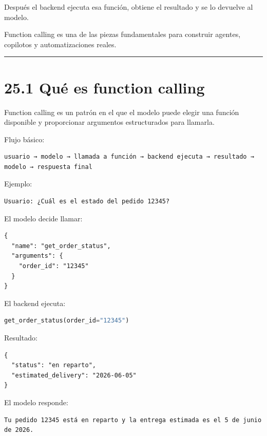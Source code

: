 Después el backend ejecuta esa función, obtiene el resultado y se lo
devuelve al modelo.

Function calling es una de las piezas fundamentales para construir
agentes, copilotos y automatizaciones reales.

\begin{center}\rule{0.5\linewidth}{0.5pt}\end{center}

\section{25.1 Qué es function calling}\label{quuxe9-es-function-calling}

Function calling es un patrón en el que el modelo puede elegir una
función disponible y proporcionar argumentos estructurados para
llamarla.

Flujo básico:

\begin{lstlisting}
usuario → modelo → llamada a función → backend ejecuta → resultado → modelo → respuesta final
\end{lstlisting}

Ejemplo:

\begin{lstlisting}
Usuario: ¿Cuál es el estado del pedido 12345?
\end{lstlisting}

El modelo decide llamar:

\begin{lstlisting}
{
  "name": "get_order_status",
  "arguments": {
    "order_id": "12345"
  }
}
\end{lstlisting}

El backend ejecuta:

\begin{lstlisting}[language=Python]
get_order_status(order_id="12345")
\end{lstlisting}

Resultado:

\begin{lstlisting}
{
  "status": "en reparto",
  "estimated_delivery": "2026-06-05"
}
\end{lstlisting}

El modelo responde:

\begin{lstlisting}
Tu pedido 12345 está en reparto y la entrega estimada es el 5 de junio de 2026.
\end{lstlisting}

